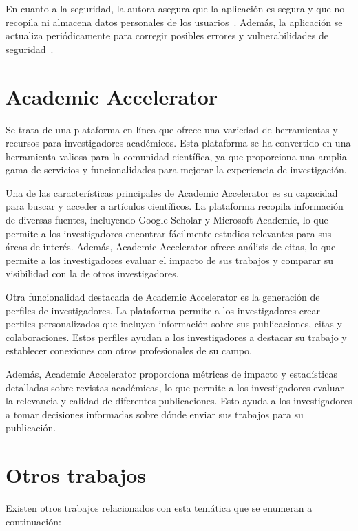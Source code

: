 En cuanto a la seguridad, la autora asegura que la aplicación es segura y que no recopila ni almacena datos personales de los usuarios~\cite{harzing2010}. Además, la aplicación se actualiza periódicamente para corregir posibles errores y vulnerabilidades de seguridad~\cite{pop2007}.


\section{Academic Accelerator~\cite{accel2023}}
 Se trata de una plataforma en línea que ofrece una variedad de herramientas y recursos para investigadores académicos. Esta plataforma se ha convertido en una herramienta valiosa para la comunidad científica, ya que proporciona una amplia gama de servicios y funcionalidades para mejorar la experiencia de investigación.

Una de las características principales de Academic Accelerator es su capacidad para buscar y acceder a artículos científicos. La plataforma recopila información de diversas fuentes, incluyendo Google Scholar y Microsoft Academic, lo que permite a los investigadores encontrar fácilmente estudios relevantes para sus áreas de interés. Además, Academic Accelerator ofrece análisis de citas, lo que permite a los investigadores evaluar el impacto de sus trabajos y comparar su visibilidad con la de otros investigadores.

Otra funcionalidad destacada de Academic Accelerator es la generación de perfiles de investigadores. La plataforma permite a los investigadores crear perfiles personalizados que incluyen información sobre sus publicaciones, citas y colaboraciones. Estos perfiles ayudan a los investigadores a destacar su trabajo y establecer conexiones con otros profesionales de su campo.

Además, Academic Accelerator proporciona métricas de impacto y estadísticas detalladas sobre revistas académicas, lo que permite a los investigadores evaluar la relevancia y calidad de diferentes publicaciones. Esto ayuda a los investigadores a tomar decisiones informadas sobre dónde enviar sus trabajos para su publicación.


\section{Otros trabajos}

Existen otros trabajos relacionados con esta temática que se enumeran a continuación:


